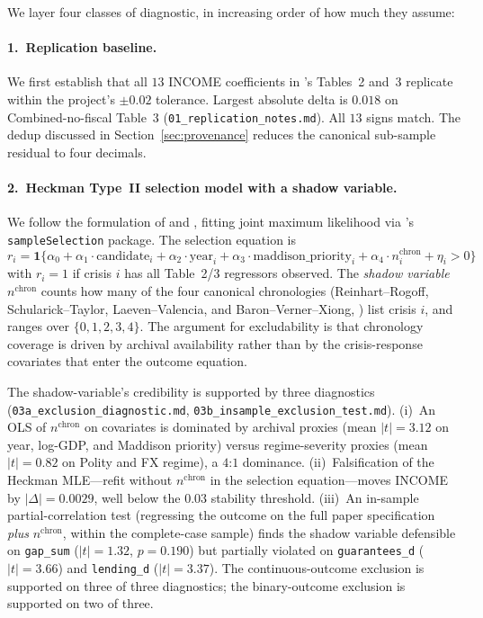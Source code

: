 \documentclass[11pt]{article}
\begin{document}
We layer four classes of diagnostic, in increasing order of how much
they assume:

\paragraph{1.~Replication baseline.} We first establish that all $13$
INCOME coefficients in \citeauthor{metrick2024}'s Tables~2 and~3
replicate within the project's $\pm 0.02$ tolerance. Largest absolute
delta is $0.018$ on Combined-no-fiscal Table~3
(\texttt{01\_replication\_notes.md}). All $13$ signs
match. The dedup discussed in Section~\ref{sec:provenance} reduces the
canonical sub-sample residual to four decimals.

\paragraph{2.~Heckman Type~II selection model with a shadow variable.}
We follow the formulation of \citet{vandeven1981} and
\citet{heckman1979}, fitting joint maximum likelihood
via \citeauthor{toomet2008}'s \texttt{sampleSelection} package.
The selection equation is
\begin{equation*}
  r_i = \mathbf{1}\{\alpha_0 + \alpha_1 \cdot \text{candidate}_i +
        \alpha_2 \cdot \text{year}_i + \alpha_3 \cdot \text{maddison\_priority}_i +
        \alpha_4 \cdot n_{i}^{\text{chron}} + \eta_i > 0\}
\end{equation*}
with $r_i = 1$ if crisis $i$ has all Table~2/3 regressors observed.
The \emph{shadow variable} $n^{\text{chron}}$ counts how many of the four
canonical chronologies (Reinhart--Rogoff, Schularick--Taylor,
Laeven--Valencia, and Baron--Verner--Xiong, \citealp{baron2021}) list
crisis $i$, and ranges over $\{0, 1, 2, 3, 4\}$. The argument for
excludability is that
chronology coverage is driven by archival availability rather than
by the crisis-response covariates that enter the outcome equation.

The shadow-variable's credibility is supported by three diagnostics
(\texttt{03a\_exclusion\_diagnostic.md},
\texttt{03b\_insample\_exclusion\_test.md}). (i)~An OLS of
$n^{\text{chron}}$ on covariates is dominated by archival proxies
(mean $|t| = 3.12$ on year, log-GDP, and Maddison priority) versus
regime-severity proxies (mean $|t| = 0.82$ on Polity and FX regime), a
$4$:$1$ dominance. (ii)~Falsification of the Heckman MLE---refit
without $n^{\text{chron}}$ in the selection equation---moves
INCOME by $|\Delta| = 0.0029$, well below the $0.03$ stability
threshold. (iii)~An in-sample partial-correlation test (regressing the
outcome on the full paper specification \emph{plus} $n^{\text{chron}}$,
within the complete-case sample) finds the shadow variable defensible
on \texttt{gap\_sum} ($|t| = 1.32$, $p = 0.190$) but partially
violated on \texttt{guarantees\_d} ($|t| = 3.66$) and
\texttt{lending\_d} ($|t| = 3.37$). The continuous-outcome exclusion
is supported on three of three diagnostics; the binary-outcome
exclusion is supported on two of three.
\end{document}
